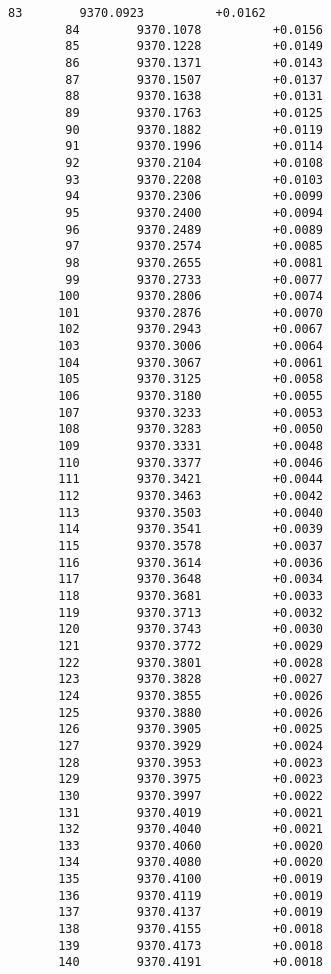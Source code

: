 \documentclass[11pt]{article}
\begin{document}
\begin{Verbatim}[commandchars=\\\{\}]
        83        9370.0923          +0.0162
        84        9370.1078          +0.0156
        85        9370.1228          +0.0149
        86        9370.1371          +0.0143
        87        9370.1507          +0.0137
        88        9370.1638          +0.0131
        89        9370.1763          +0.0125
        90        9370.1882          +0.0119
        91        9370.1996          +0.0114
        92        9370.2104          +0.0108
        93        9370.2208          +0.0103
        94        9370.2306          +0.0099
        95        9370.2400          +0.0094
        96        9370.2489          +0.0089
        97        9370.2574          +0.0085
        98        9370.2655          +0.0081
        99        9370.2733          +0.0077
       100        9370.2806          +0.0074
       101        9370.2876          +0.0070
       102        9370.2943          +0.0067
       103        9370.3006          +0.0064
       104        9370.3067          +0.0061
       105        9370.3125          +0.0058
       106        9370.3180          +0.0055
       107        9370.3233          +0.0053
       108        9370.3283          +0.0050
       109        9370.3331          +0.0048
       110        9370.3377          +0.0046
       111        9370.3421          +0.0044
       112        9370.3463          +0.0042
       113        9370.3503          +0.0040
       114        9370.3541          +0.0039
       115        9370.3578          +0.0037
       116        9370.3614          +0.0036
       117        9370.3648          +0.0034
       118        9370.3681          +0.0033
       119        9370.3713          +0.0032
       120        9370.3743          +0.0030
       121        9370.3772          +0.0029
       122        9370.3801          +0.0028
       123        9370.3828          +0.0027
       124        9370.3855          +0.0026
       125        9370.3880          +0.0026
       126        9370.3905          +0.0025
       127        9370.3929          +0.0024
       128        9370.3953          +0.0023
       129        9370.3975          +0.0023
       130        9370.3997          +0.0022
       131        9370.4019          +0.0021
       132        9370.4040          +0.0021
       133        9370.4060          +0.0020
       134        9370.4080          +0.0020
       135        9370.4100          +0.0019
       136        9370.4119          +0.0019
       137        9370.4137          +0.0019
       138        9370.4155          +0.0018
       139        9370.4173          +0.0018
       140        9370.4191          +0.0018

\end{Verbatim}
\end{document}
